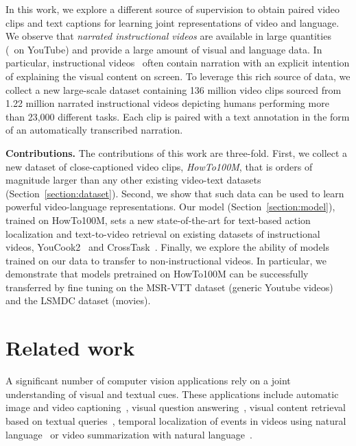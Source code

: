 \documentclass[10pt,twocolumn,letterpaper]{article}
\begin{document}
In this work, we explore a different source of supervision to obtain paired video clips and text captions for learning joint representations of video and language.
We observe that \emph{narrated instructional videos} are available in large quantities (\eg~on YouTube) and provide a large amount of visual and language data.
In particular, instructional videos~\cite{alayrac16unsupervised,malmaud15what,zhukov2019crosstask} often contain narration with an explicit intention of explaining the visual content on screen. To leverage this rich source of data, we collect a new large-scale dataset containing 136 million video clips sourced from 1.22 million narrated instructional videos depicting humans performing more than 23,000 different tasks.
Each clip is paired with a text annotation in the form of an automatically transcribed narration.




{\bf \noindent Contributions.}
The contributions of this work are three-fold.
First, we collect a new dataset of close-captioned video clips, \emph{HowTo100M}, that is orders of magnitude larger than any other existing video-text datasets (Section~\ref{section:dataset}).
Second, we show that such data can be used to learn powerful video-language representations.
Our model (Section~\ref{section:model}), trained on HowTo100M, sets a new state-of-the-art for text-based action localization and text-to-video retrieval on existing datasets of instructional videos, YouCook2~\cite{youcook2} and CrossTask~\cite{zhukov2019crosstask}.
Finally, we explore the ability of models trained on our data to transfer to non-instructional videos.
In particular, we demonstrate that models pretrained on HowTo100M can be successfully transferred by fine tuning
on the MSR-VTT dataset (generic Youtube videos) and the LSMDC dataset (movies).


 

\section{Related work}
\label{section:related}

A significant number of computer vision applications rely on a joint understanding of visual and textual cues.
These applications include automatic image and video captioning~\cite{johnson16densecap,pan16hierarchical,you16image,yu2016video}, visual question answering~\cite{fukui16multimodal,malinowski15ask,tapaswi16movieqa,yu18joint}, visual content retrieval based on textual queries~\cite{miech18learning,wang2019learning,yu18joint}, temporal localization of events in videos using natural language~\cite{hendricks17localizing,krishna2017dense} or video summarization with natural language~\cite{plummer2017enhancing}.
\end{document}
